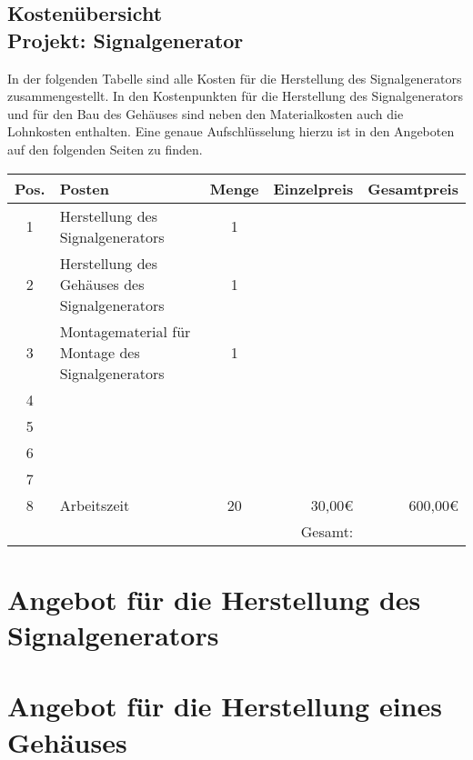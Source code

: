 \documentclass[a4paper,12pt]{article}
\begin{document}
\begin{center}
\section*{Kostenübersicht \\ Projekt: Signalgenerator}
\end{center}
In der folgenden Tabelle sind alle Kosten für die Herstellung des Signalgenerators zusammengestellt. In den Kostenpunkten für die Herstellung des Signalgenerators und für den Bau des Gehäuses sind neben den Materialkosten auch die Lohnkosten enthalten. Eine genaue Aufschlüsselung hierzu ist in den Angeboten auf den folgenden Seiten zu finden.
\bigskip
\begin{center}

\begin{tabular}{cp{7cm}cr|r|}
\hline
\multicolumn{1}{|l|}{Pos.} & \multicolumn{1}{l|}{Posten} & \multicolumn{1}{l|}{Menge} & Einzelpreis & Gesamtpreis \\ \hline
\multicolumn{1}{|c|}{1} & \multicolumn{1}{l|}{Herstellung des Signalgenerators} & \multicolumn{1}{c|}{1} &  &  \\ \hline
\multicolumn{1}{|c|}{2} & \multicolumn{1}{l|}{Herstellung des Gehäuses des Signalgenerators} & \multicolumn{1}{c|}{1} &  &  \\ \hline
\multicolumn{1}{|c|}{3} & \multicolumn{1}{l|}{Montagematerial für Montage des Signalgenerators} & \multicolumn{1}{c|}{1} &  &  \\ \hline
\multicolumn{1}{|c|}{4} & \multicolumn{1}{l|}{} & \multicolumn{1}{c|}{} &  &  \\ \hline
\multicolumn{1}{|c|}{5} & \multicolumn{1}{l|}{} & \multicolumn{1}{c|}{} &  &  \\ \hline
\multicolumn{1}{|c|}{6} & \multicolumn{1}{l|}{} & \multicolumn{1}{c|}{} &  &  \\ \hline
\multicolumn{1}{|c|}{7} & \multicolumn{1}{l|}{} & \multicolumn{1}{c|}{} &  &  \\ \hline
\multicolumn{1}{|c|}{8} & \multicolumn{1}{l|}{Arbeitszeit} & \multicolumn{1}{c|}{20} & 30,00\euro & 600,00\euro \\ \hline
                       &                       &                       & Gesamt: &  \\ \cline{5-5} 
\end{tabular}

\end{center}



\pagebreak
\section*{Angebot für die Herstellung des Signalgenerators}


\pagebreak
\section*{Angebot für die Herstellung eines Gehäuses}
\end{document}
